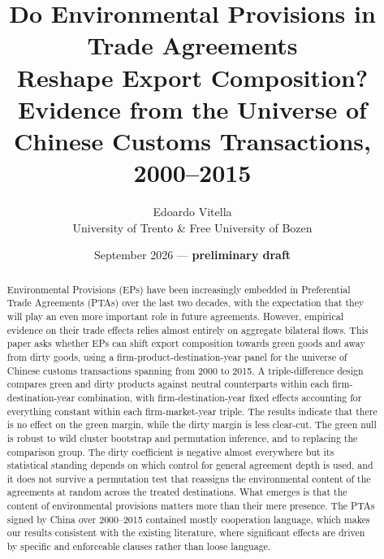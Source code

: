 \documentclass[12pt]{article}
\title{Do Environmental Provisions in Trade Agreements\\ Reshape Export Composition?\\
\large Evidence from the Universe of Chinese Customs Transactions, 2000--2015}
\author{Edoardo Vitella\\
\small University of Trento \& Free University of Bozen}
\date{September 2026 --- \textbf{preliminary draft}}
\begin{document}
\maketitle

\begin{abstract}
\noindent
\noindent
Environmental Provisions (EPs) have been increasingly embedded in Preferential Trade Agreements (PTAs) over the last two decades, with the expectation that they will play an even more important role in future agreements. However, empirical evidence on their trade effects relies almost entirely on aggregate bilateral flows. This paper asks whether EPs can shift export composition towards green goods and away from dirty goods, using a firm-product-destination-year panel for the universe of Chinese customs transactions spanning from 2000 to 2015. A triple-difference design compares green and dirty products against neutral counterparts within each firm-destination-year combination, with firm-destination-year fixed effects accounting for everything constant within each firm-market-year triple. The results indicate that there is no effect on the green margin, while the dirty margin is less clear-cut. The green null is robust to wild cluster bootstrap and permutation inference, and to replacing the comparison group. The dirty coefficient is negative almost everywhere but its statistical standing depends on which control for general agreement depth is used, and it does not survive a permutation test that reassigns the environmental content of the agreements at random across the treated destinations. What emerges is that the content of environmental provisions matters more than their mere presence. The PTAs signed by China over 2000--2015 contained mostly cooperation language, which makes our results consistent with the existing literature, where significant effects are driven by specific and enforceable clauses rather than loose language.







\end{abstract}
\end{document}
